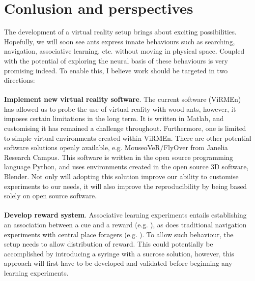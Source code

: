 \chapter{Conlusion and perspectives}
\label{chap:persp}
The development of a virtual reality setup brings about exciting possibilities. Hopefully, we will soon see ants express innate behaviours such as searching, navigation, associative learning, etc. without moving in physical space. Coupled with the potential of exploring the neural basis of these behaviours is very promising indeed.
To enable this, I believe work should be targeted in two directions: \\ \\
\textbf{Implement new virtual reality software}. The current software (ViRMEn) has allowed us to probe the use of virtual reality with wood ants, however, it imposes certain limitations in the long term. It is written in Matlab, and customising it has remained a challenge throughout. Furthermore, one is limited to simple virtual environments created within ViRMEn. There are other potential software solutions openly available, e.g. MouseoVeR/FlyOver from Janelia Research Campus. This software is written in the open source programming language Python, and uses environments created in the open source 3D software, Blender. Not only will adopting this solution improve our ability to customise experiments to our needs, it will also improve the reproducibility by being based solely on open source software. \\ \\
\textbf{Develop reward system}. Associative learning experiments entails establishing an association between a cue and a reward (e.g. \cite{Fernandes2017a}), as does traditional navigation experiments with central place foragers (e.g. \cite{Buehlmann2018}). To allow such behaviour, the setup needs to allow distribution of reward. This could potentially be accomplished by introducing a syringe with a sucrose solution, however, this approach will first have to be developed and validated before beginning any learning experiments. 